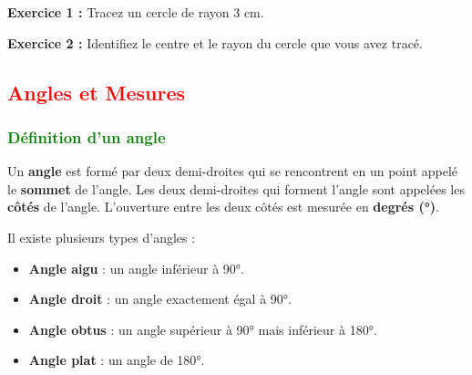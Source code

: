 \documentclass{article}
\begin{document}
\vspace{0.2cm}

\begin{tcolorbox}[colback=yellow!10!white, colframe=yellow!75!black, title=\textcolor{white}{Exercices}, sharp corners=south]
    \textbf{Exercice 1 :} Tracez un cercle de rayon 3 cm.

    \textbf{Exercice 2 :} Identifiez le centre et le rayon du cercle que vous avez tracé.
\end{tcolorbox}

\vspace{0.5cm}

\subsection{\textcolor{red}{Angles et Mesures}}

\subsubsection{\textcolor{green}{Définition d'un angle}}

\begin{tcolorbox}[colback=red!10!white, colframe=red!75!black, title=\textcolor{white}{Définition : Angle}, sharp corners=south]
    Un \textbf{angle} est formé par deux demi-droites qui se rencontrent en un point appelé le \textbf{sommet} de l'angle. Les deux demi-droites qui forment l'angle sont appelées les \textbf{côtés} de l'angle. L'ouverture entre les deux côtés est mesurée en \textbf{degrés (°)}.
\end{tcolorbox}

\begin{tcolorbox}[colback=purple!10!white, colframe=purple!75!black, title=\textcolor{white}{Note}, sharp corners=south]
    Il existe plusieurs types d'angles :
    \begin{itemize}
        \item \textbf{Angle aigu} : un angle inférieur à 90°.
        \item \textbf{Angle droit} : un angle exactement égal à 90°.
        \item \textbf{Angle obtus} : un angle supérieur à 90° mais inférieur à 180°.
        \item \textbf{Angle plat} : un angle de 180°.
    \end{itemize}
\end{tcolorbox}

\vspace{0.2cm}
\end{document}
